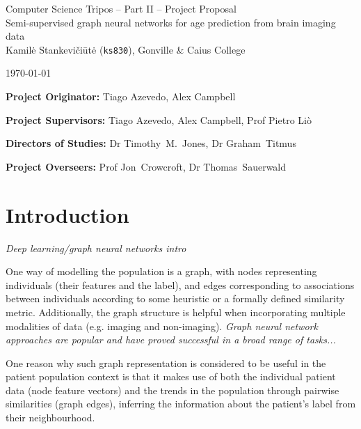 \documentclass[12pt,a4paper,twoside]{article}
\begin{document}
\begin{center}
\Large
Computer Science Tripos -- Part II -- Project Proposal\\[4mm]
\LARGE
Semi-supervised graph neural networks for age prediction from brain imaging data \\[4mm]

\large
Kamilė Stankevičiūtė (\texttt{ks830}), Gonville \& Caius College

\today %
\end{center}

\vspace{5mm}
\textbf{Project Originator:} Tiago Azevedo, Alex Campbell

\textbf{Project Supervisors:} Tiago Azevedo, Alex Campbell, Prof Pietro Liò

\textbf{Directors of Studies:} Dr Timothy~M.~Jones, Dr Graham~Titmus

\textbf{Project Overseers:} Prof Jon~Crowcroft, Dr Thomas~Sauerwald


\section*{Introduction}

\textit{Deep learning/graph neural networks intro}


One way of modelling the population is a graph, with nodes representing individuals (their features and the label), and edges corresponding to associations between individuals according to some heuristic or a formally defined similarity metric. Additionally, the graph structure is helpful when incorporating multiple modalities of data (e.g. imaging and non-imaging). \textit{Graph neural network approaches are popular and have proved successful in a broad range of tasks...}

One reason why such graph representation is considered to be useful in the patient population context is that it makes use of both the individual patient data (node feature vectors) and the trends in the population through pairwise similarities (graph edges), inferring the information about the patient's label from their neighbourhood.
\end{document}
